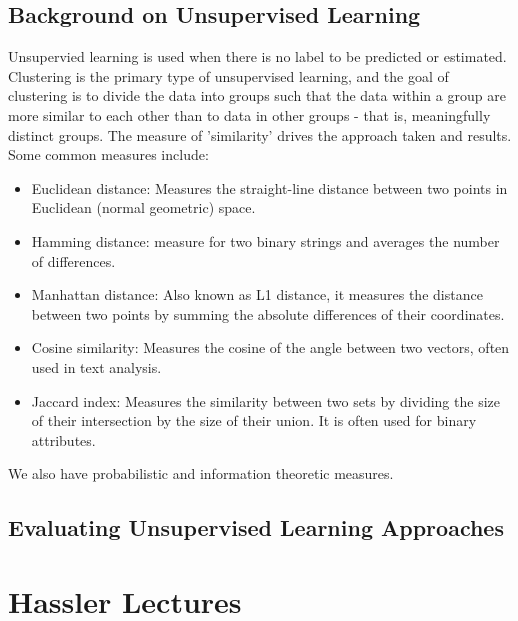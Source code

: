 \documentclass[11pt]{article}
\begin{document}
\subsection{Background on Unsupervised Learning}

Unsupervied learning is used when there is no label to be predicted or estimated.
Clustering is the primary type of unsupervised learning, and the goal of clustering is to divide the data into groups such that the data within a group are more similar to each other than to data in other groups - that is, meaningfully distinct groups. 
The measure of 'similarity' drives the approach taken and results. Some common measures include:

\begin{itemize}
    \item Euclidean distance: Measures the straight-line distance between two points in Euclidean (normal geometric) space.
    \item Hamming distance: measure for two binary strings and averages the number of differences.
    \item Manhattan distance: Also known as L1 distance, it measures the distance between two points by summing the absolute differences of their coordinates.
    \item Cosine similarity: Measures the cosine of the angle between two vectors, often used in text analysis.
    \item Jaccard index: Measures the similarity between two sets by dividing the size of their intersection by the size of their union. It is often used for binary attributes.
\end{itemize}

We also have probabilistic and information theoretic measures.

\subsection{Evaluating Unsupervised Learning Approaches}

\FloatBarrier
\newpage
\section{Hassler Lectures}
\end{document}
